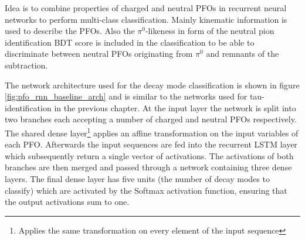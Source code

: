 Idea is to combine properties of charged and neutral PFOs in recurrent neural
networks to perform multi-class classification. Mainly kinematic information is
used to describe the PFOs. Also the $\pi^0$-likeness in form of the neutral pion
identification BDT score is included in the classification to be able to
discriminate between neutral PFOs originating from $\pi^0$ and remnants of the
subtraction.



The network architecture used for the decay mode classification is shown in
figure \ref{fig:pfo_rnn_baseline_arch} and is similar to the networks used for
tau-identification in the previous chapter. At the input layer the network is
split into two branches each accepting a number of charged and neutral PFOs
respectively. The shared dense layer\footnote{Applies the same transformation on
  every element of the input sequence} applies an affine transformation on the
input variables of each PFO. Afterwards the input sequences are fed into the
recurrent LSTM layer which subsequently return a single vector of activations.
The activations of both branches are then merged and passed through a network
containing three dense layers. The final dense layer has five units (the number
of decay modes to classify) which are activated by the Softmax activation
function, ensuring that the output activations sum to one.

